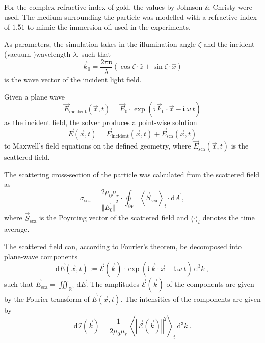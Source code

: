 \documentclass[10pt]{article}
\begin{document}
For the complex refractive index of gold, the values by Johnson \& Christy \cite{Johnson1972} were used. 
The medium surrounding the particle was modelled with a refractive index of $1.51$ to mimic the immersion oil used in the experiments. 

As parameters, the simulation takes in the illumination angle $\zeta$ and the incident (vacuum-)wavelength $\lambda$, such that
$$
    \vec{k}_0 = \frac{2\pi \mathfrak{n}}{\lambda} \left( \cos\zeta \cdot \hat{z} + \sin\zeta \cdot \hat{x} \right)
$$
is the wave vector of the incident light field. 

Given a plane wave 
$$
    \vec{E}_\mathrm{incident}(\vec{x},t) = \vec{E}_0 \cdot \exp\!\left( \mathfrak{i}\ \vec{k}_0\cdot\vec{x} - \mathfrak{i}\ \omega\ t \right)
$$
as the incident field, the solver produces a point-wise solution 
$$
    \vec{E}(\vec{x},t) = \vec{E}_\mathrm{incident}(\vec{x},t) + \vec{E}_\mathrm{sca}(\vec{x},t)
$$ 
to Maxwell's field equations on the defined geometry, where $\vec{E}_\mathrm{sca}(\vec{x},t)$ is the scattered field. 


The scattering cross-section of the particle was calculated from the scattered field as 
$$
    \sigma_\mathrm{sca} = \frac{2 \mu_0 \mu_r}{ {\bigl\Vert \vec{E}_0 \bigr\Vert}^2 } \cdot \oint_{\partial V} {\left\langle \vec{S}_\mathrm{sca} \right\rangle}_t \cdot\mathrm{d}\vec{A} \ ,
$$
where $\vec{S}_\mathrm{sca}$ is the Poynting vector of the scattered field and $\langle\cdot\rangle_t$ denotes the time average. 

The scattered field can, according to Fourier's theorem, be decomposed into plane-wave components
$$
    \mathrm{d}\vec{E}(\vec{x},t) := \vec{\mathcal{E}}(\vec{k}) 
    \cdot 
    \exp{\!\left(\mathfrak{i}\ \vec{k}\cdot\vec{x} - \mathfrak{i}\ \omega\ t \right)}
    \ \mathrm{d}^3 k
    \ , 
$$
such that $ \vec{E}_\mathrm{sca} = \iiint_{\mathds{R}^3}\,\mathrm{d}\vec{E}$. 
The amplitudes $\vec{\mathcal{E}}(\vec{k})$ of the components are given by the Fourier transform of $\vec{E}(\vec{x},t)$. 
The intensities of the components are given by \cite{Griffiths-ED,MA} 
$$
    \mathrm{d}\mathcal{I}(\vec{k}) = \frac{ 1 }{ 2\mu_0 \mu_r }\,{\left\langle {\left\Vert \vec{\mathcal{E}}(\vec{k}) \right\Vert}^2 \right\rangle}_t \ \mathrm{d}^3k
    \ .
$$
\end{document}
